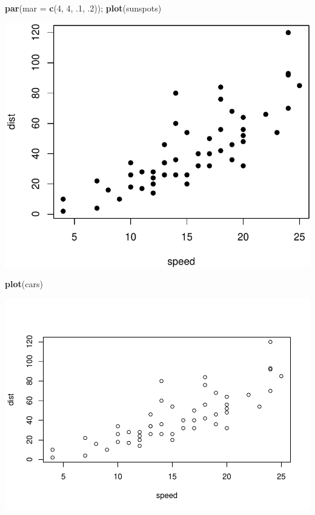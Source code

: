 \documentclass[
]{book}
\newenvironment{Shaded}{\begin{snugshade}}{\end{snugshade}}
\newcommand{\AttributeTok}[1]{\textcolor[rgb]{0.13,0.29,0.53}{#1}}
\newcommand{\DecValTok}[1]{\textcolor[rgb]{0.00,0.00,0.81}{#1}}
\newcommand{\FunctionTok}[1]{\textcolor[rgb]{0.13,0.29,0.53}{\textbf{#1}}}
\newcommand{\NormalTok}[1]{#1}
\theoremstyle{definition}
\theoremstyle{definition}
\theoremstyle{definition}
\theoremstyle{definition}
\theoremstyle{remark}
\begin{document}
\begin{Shaded}
\begin{Highlighting}[]
\FunctionTok{par}\NormalTok{(}\AttributeTok{mar =} \FunctionTok{c}\NormalTok{(}\DecValTok{4}\NormalTok{, }\DecValTok{4}\NormalTok{, .}\DecValTok{1}\NormalTok{, .}\DecValTok{2}\NormalTok{)); }\FunctionTok{plot}\NormalTok{(sunspots)}
\end{Highlighting}
\end{Shaded}

\includegraphics{202401280001-test_files/figure-latex/unnamed-chunk-11-1.pdf}

\begin{Shaded}
\begin{Highlighting}[]
\FunctionTok{plot}\NormalTok{(cars)}
\end{Highlighting}
\end{Shaded}

\includegraphics{202401280001-test_files/figure-latex/fig-margin-1.pdf}
\end{document}
